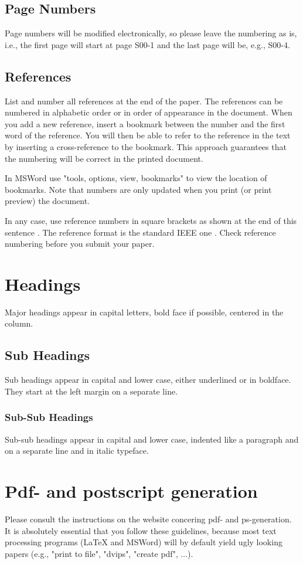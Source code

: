 \documentclass{article}
\begin{document}
\subsection{Page Numbers}
Page numbers will be modified electronically, so please leave the
numbering as is, i.e., the first page will start at page S00-1 and the
last page will be, e.g., S00-4. 

\subsection{References}
List and number all references at the end of the paper. The references
can be numbered in alphabetic order or in order of appearance in the
document. When you add a new reference, insert a bookmark between the
number and the first word of the reference. You will then be able to
refer to the reference in the text by inserting a cross-reference to
the bookmark. This approach guarantees that the numbering will be
correct in the printed document.  

In MSWord use "tools, options, view, bookmarks" to view the location
of bookmarks. Note that numbers are only updated when you print (or
print preview) the document.

In any case, use reference numbers in square brackets as shown at the
end of this sentence \cite{sps1} \cite{sps3}. The reference format is
the standard IEEE one \cite{sps2}. Check reference numbering before
you submit your paper.  

\section{Headings}
Major headings appear in capital letters, bold face if possible,
centered in the column. 

\subsection{Sub Headings}
Sub headings appear in capital and lower case, either underlined or in
boldface. They start at the left margin on a separate line. 

\subsubsection{Sub-Sub Headings}
Sub-sub headings appear in capital and lower case, indented like a
paragraph and on a separate line and in italic typeface. 

\section{Pdf- and postscript generation}
Please consult the instructions on the website concering pdf- and
ps-generation. It is absolutely essential that you follow these
guidelines, because most text processing programs (LaTeX and MSWord)
will by default yield ugly looking papers (e.g., "print to file",
"dvips", "create pdf", ...). 



\end{document}
